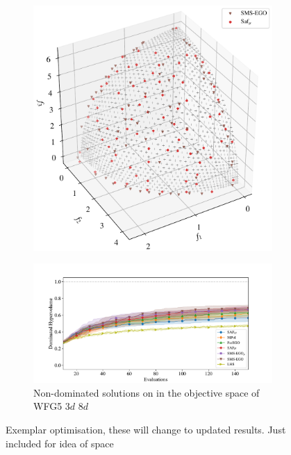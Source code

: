 \documentclass[conference]{IEEEtran}
\newcommand{\ndim}{d}
\begin{document}
\begin{figure}[t]
\begin{subfigure}[b]{\columnwidth}
         \centering
         \includegraphics[width=\columnwidth]{figures/_comparison_attainmenPoints_sms_saf.pdf}
         \caption{}
         \label{fig: exemplar_pf_sms_saf}
     \end{subfigure}
\begin{subfigure}[b]{\columnwidth}
         \centering
         \includegraphics[width=\columnwidth]{figures/wfg5_3obj_8dim_hv_plot.pdf}
         \caption{Non-dominated solutions on in the objective space of WFG5 3$\ndim$ 8$\ndim$}
         \label{fig: exemplar_pf_sms_saf_hv}
     \end{subfigure}
\caption{Exemplar optimisation, these will change to updated results. Just included for idea of space}
\label{fig: exemplar_pf}
\end{figure}
\end{document}
